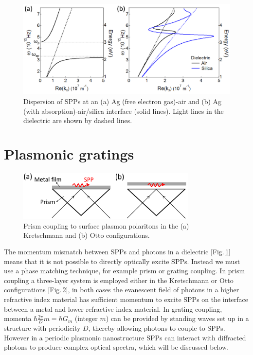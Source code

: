 \begin{figure}[h!] 
\centering    
\includegraphics[width=\textwidth]{Fig2}
\caption{Dispersion of SPPs at an (a) Ag (free electron gas)-air \cite{Zeman1987} and (b) Ag (with absorption)-air/silica interface \cite{Johnson1972} (solid lines). Light lines in the dielectric are shown by dashed lines.}
\label{3Fig2}
\end{figure}


\section{Plasmonic gratings}
\label{sec:plasmonicgratings}
\begin{figure}[h!]
\centering
\includegraphics[width=0.8\textwidth]{PrismCoupling}
\caption{Prism coupling to surface plasmon polaritons in the (a) Kretschmann and (b) Otto configurations.}
\label{PrismCoupling}
\end{figure}
The momentum mismatch between SPPs and photons in a dielectric [Fig.\,\ref{3Fig2}] means that it is not possible to directly optically excite SPPs. Instead we must use a phase matching technique, for example prism or grating coupling. In prism coupling a three-layer system is employed either in the Kretschmann or Otto configurations [Fig.\,\ref{PrismCoupling}], in both cases the evanescent field of photons in a higher refractive index material has sufficient momentum to excite SPPs on the interface between a metal and lower refractive index material. In grating coupling, momenta $\hbar\frac{2\pi}{D}m = \hbar G_m$ (integer $m$) can be provided by standing waves set up in a structure with periodicity $D$, thereby allowing photons to couple to SPPs. However in a periodic plasmonic nanostructure SPPs can interact with diffracted photons to produce complex optical spectra, which will be discussed below.

